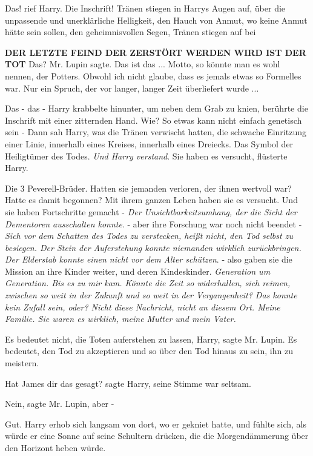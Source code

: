 \glqq{}Das!\grqq{} rief Harry. \glqq{}Die Inschrift!\grqq{} Tränen stiegen in
Harrys Augen auf, über die unpassende und unerklärliche Helligkeit, den Hauch
von Anmut, wo keine Anmut hätte sein sollen, den geheimnisvollen Segen, Tränen
stiegen auf bei

\textbf{DER LETZTE FEIND DER ZERSTÖRT
WERDEN WIRD IST DER TOT}     \glqq{}
Das?\grqq{} Mr. Lupin sagte. \glqq{}Das ist das ... Motto, so könnte man es wohl
nennen, der Potters. Obwohl ich nicht glaube, dass es jemals etwas so Formelles
war. Nur ein Spruch, der vor langer, langer Zeit überliefert wurde ...\grqq{}

\glqq{}Das - das -\grqq{} Harry krabbelte hinunter, um neben dem Grab zu knien,
berührte die Inschrift mit einer zitternden Hand. \glqq{}Wie? So etwas kann nicht
einfach genetisch sein -\grqq{} Dann sah Harry, was die Tränen verwischt hatten,
die schwache Einritzung einer Linie, innerhalb eines Kreises, innerhalb eines
Dreiecks. Das Symbol der Heiligtümer des Todes. \emph{Und Harry verstand}. \glqq{}
Sie haben es versucht\grqq{}, flüsterte Harry.

Die 3 Peverell-Brüder. Hatten sie jemanden verloren, der ihnen wertvoll war?
Hatte es damit begonnen? \glqq{}Mit ihrem ganzen Leben haben sie es versucht. Und
sie haben Fortschritte gemacht -\grqq{} \emph{Der Unsichtbarkeitsumhang, der die
Sicht der Dementoren ausschalten konnte}. \glqq{}- aber ihre Forschung war noch
nicht beendet -\grqq{} \emph{Sich vor dem Schatten des Todes zu verstecken,
heißt nicht, den Tod selbst zu besiegen. Der Stein der Auferstehung konnte
niemanden wirklich zurückbringen. Der Elderstab konnte einen nicht vor dem Alter
schützen}. \glqq{}- also gaben sie die Mission an ihre Kinder weiter, und deren
Kindeskinder.\grqq{} \emph{Generation um Generation. Bis es zu mir kam. Könnte
die Zeit so widerhallen, sich reimen, zwischen so weit in der Zukunft und so
weit in der Vergangenheit? Das konnte kein Zufall sein, oder? Nicht diese
Nachricht, nicht an diesem Ort. Meine Familie. Sie waren es wirklich, meine
Mutter und mein Vater.}

\glqq{}Es bedeutet nicht, die Toten auferstehen zu lassen, Harry\grqq{}, sagte
Mr. Lupin. \glqq{}Es bedeutet, den Tod zu akzeptieren und so über den Tod hinaus
zu sein, ihn zu meistern.\grqq{}

\glqq{}Hat James dir das gesagt?\grqq{} sagte Harry, seine Stimme war seltsam.

\glqq{}Nein\grqq{}, sagte Mr. Lupin, \glqq{}aber -\grqq{}

\glqq{}Gut.\grqq{} Harry erhob sich langsam von dort, wo er gekniet hatte, und
fühlte sich, als würde er eine Sonne auf seine Schultern drücken, die die
Morgendämmerung über den Horizont heben würde.

